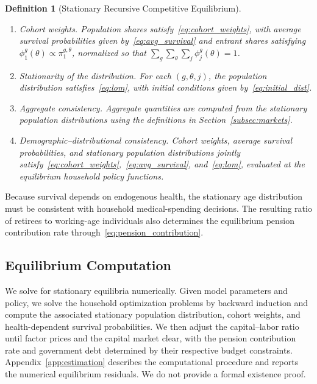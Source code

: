 \documentclass[12pt,a4paper]{article}
\newtheorem{definition}{Definition}
\begin{document}
\begin{definition}[Stationary Recursive Competitive Equilibrium]
\begin{enumerate}
\item \emph{Cohort weights.} Population shares satisfy~\eqref{eq:cohort_weights}, with average survival probabilities given by~\eqref{eq:avg_survival} and entrant shares satisfying $\phi_1^{g}(\theta)\propto\pi_1^{g,\theta}$, normalized so that $\sum_g\sum_\theta\sum_j\phi_j^{g}(\theta)=1$.
\item \emph{Stationarity of the distribution.} For each $(g,\theta,j)$, the population distribution satisfies~\eqref{eq:lom}, with initial conditions given by~\eqref{eq:initial_dist}.
\item \emph{Aggregate consistency.} Aggregate quantities are computed from the stationary population distributions using the definitions in Section~\ref{subsec:markets}.
\item \emph{Demographic--distributional consistency.} Cohort weights, average survival probabilities, and stationary population distributions jointly satisfy~\eqref{eq:cohort_weights},~\eqref{eq:avg_survival}, and~\eqref{eq:lom}, evaluated at the equilibrium household policy functions.
\end{enumerate}
\end{definition}

Because survival depends on endogenous health, the stationary age distribution must be consistent with household medical-spending decisions. The resulting ratio of retirees to working-age individuals also determines the equilibrium pension contribution rate through~\eqref{eq:pension_contribution}.


\subsection{Equilibrium Computation}
\label{subsec:existence}

We solve for stationary equilibria numerically. Given model parameters and policy, we solve the household optimization problems by backward induction and compute the associated stationary population distribution, cohort weights, and health-dependent survival probabilities. We then adjust the capital--labor ratio until factor prices and the capital market clear, with the pension contribution rate and government debt determined by their respective budget constraints. Appendix~\ref{app:estimation} describes the computational procedure and reports the numerical equilibrium residuals. We do not provide a formal existence proof.
\end{document}
